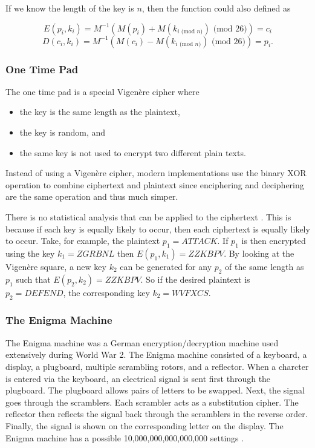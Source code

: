 \documentclass[12pt]{article}
\begin{document}
If we know the length of the key is $n$, then the function could also defined as

$$E(p_i, k_i)=M^{-1}(M(p_i)+M(k_{i\text{ (mod $n$)}}) \text{ (mod 26)})=c_i$$
$$D(c_i, k_i)=M^{-1}(M(c_i)-M(k_{i\text{ (mod $n$)}}) \text{ (mod 26)})=p_i.$$

\subsubsection{One Time Pad}
The one time pad is a special Vigen\`{e}re cipher where
\begin{itemize}
	\item the key is the same length as the plaintext,
	\item the key is random, and
	\item the same key is not used to encrypt two different plain texts.
\end{itemize}
Instead of using a Vigen\`{e}re cipher, modern implementations use the binary XOR operation to combine ciphertext and plaintext since enciphering and deciphering are the same operation and thus much simper.

There is no statistical analysis that can be applied to the ciphertext \cite[pg. 393]{compsec}. This is because if each key is equally likely to occur, then each ciphertext is equally likely to occur. Take, for example, the plaintext $p_1=ATTACK$. If $p_1$ is then encrypted using the key $k_1=ZGRBNL$ then $E(p_1,k_1)=ZZKBPV$. By looking at the Vigen\`{e}re square, a new key $k_2$ can be generated for any $p_2$ of the same length as $p_1$ such that $E(p_2,k_2)=ZZKBPV$. So if the desired plaintext is $p_2=DEFEND$, the corresponding key $k_2=WVFXCS$.

\subsubsection{The Enigma Machine}
The Enigma machine was a German encryption/decryption machine used extensively during World War 2. The Enigma machine consisted of a keyboard, a display, a plugboard, multiple scrambling rotors, and a reflector. When a charcter is entered via the keyboard, an electrical signal is sent first through the plugboard. The plugboard allows pairs of letters to be swapped. Next, the signal goes through the scramblers. Each scrambler acts as a substitution cipher. The reflector then reflects the signal back through the scramblers in the reverse order. Finally, the signal is shown on the corresponding letter on the display. The Enigma machine has a possible 10,000,000,000,000,000 settings \cite[pg. 136]{codebook}.
\end{document}
